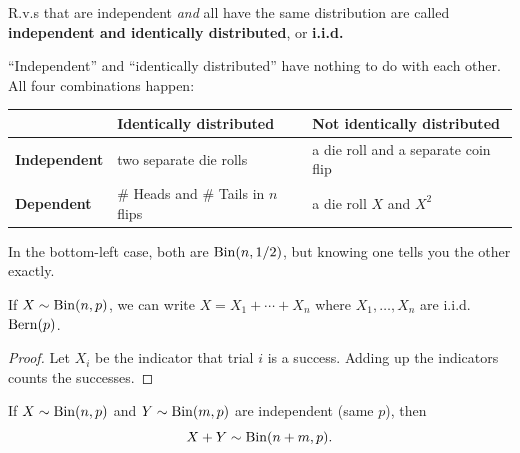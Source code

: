 \bigskip

\begin{definition}[i.i.d.]\label{def:iid}
R.v.s that are independent \emph{and} all have the same distribution are called \textbf{independent and identically distributed}, or \textbf{i.i.d.}
\end{definition}

\bigskip

\begin{example}
``Independent'' and ``identically distributed'' have nothing to do with each other. All four combinations happen:
\medskip
\begin{center}
\begin{tabular}{@{}lll@{}}
\toprule
 & \textbf{Identically distributed} & \textbf{Not identically distributed} \\
\midrule
\textbf{Independent} & two separate die rolls & a die roll and a separate coin flip \\
\textbf{Dependent}   & \# Heads and \# Tails in $n$ flips & a die roll $X$ and $X^{2}$ \\
\bottomrule
\end{tabular}
\end{center}
\medskip
In the bottom-left case, both are $\operatorname{Bin}(n, 1/2)$, but knowing one tells you the other exactly.
\end{example}

\bigskip

\begin{theorem}\label{thm:binsum}
If $X \sim \operatorname{Bin}(n, p)$, we can write $X = X_1 + \cdots + X_n$ where $X_1, \dots, X_n$ are i.i.d.\ $\operatorname{Bern}(p)$.
\end{theorem}

\medskip

\begin{proof}
Let $X_i$ be the indicator that trial $i$ is a success. Adding up the indicators counts the successes.
\end{proof}

\bigskip

\begin{theorem}\label{thm:binadd}
If $X \sim \operatorname{Bin}(n, p)$ and $Y \sim \operatorname{Bin}(m, p)$ are independent (same $p$), then
\medskip
\[
X + Y \sim \operatorname{Bin}(n + m, p).
\]
\end{theorem}

\medskip

